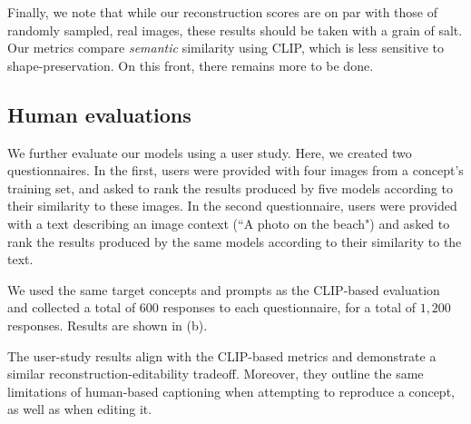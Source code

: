 Finally, we note that while our reconstruction scores are on par with those of randomly sampled, real images, these results should be taken with a grain of salt. Our metrics compare \textit{semantic} similarity using CLIP, which is less sensitive to shape-preservation. On this front, there remains more to be done.








\subsection{Human evaluations}

We further evaluate our models using a user study. Here, we created two questionnaires. In the first, users were provided with four images from a concept's training set, and asked to rank the results produced by five models according to their similarity to these images. In the second questionnaire, users were provided with a text describing an image context (``A photo on the beach") and asked to rank the results produced by the same models according to their similarity to the text.

We used the same target concepts and prompts as the CLIP-based evaluation and collected a total of $600$ responses to each questionnaire, for a total of $1,200$ responses. Results are shown in (b).

The user-study results align with the CLIP-based metrics and demonstrate a similar reconstruction-editability tradeoff. Moreover, they outline the same limitations of human-based captioning when attempting to reproduce a concept, as well as when editing it.